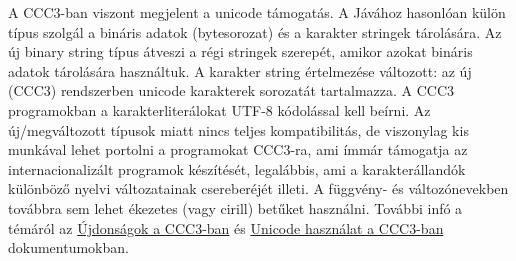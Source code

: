 A CCC3-ban viszont megjelent a unicode támogatás.
A Jávához hasonlóan külön típus szolgál a bináris
adatok (bytesorozat) és a karakter stringek tárolására.
Az új binary string típus átveszi a régi stringek szerepét,
amikor azokat bináris adatok tárolására használtuk.
A karakter string értelmezése változott: 
az új (CCC3) rendszerben unicode karakterek sorozatát tartalmazza.
A CCC3 programokban a karakterliterálokat UTF-8 kódolással kell beírni.
Az új/megváltozott típusok miatt nincs teljes kompatibilitás,
de viszonylag kis munkával lehet portolni a programokat CCC3-ra, 
ami ímmár támogatja az internacionalizált programok készítését,
legalábbis, ami a karakterállandók különböző nyelvi változatainak 
csereberéjét illeti. 
A függvény- és változónevekben továbbra sem lehet ékezetes 
(vagy cirill) betűket használni.
További infó a témáról az
\href{ccc3_ujdonsagok.html}{Újdonságok a CCC3-ban} és
\href{ccc3_unicode_hasznalat.html}{Unicode használat a CCC3-ban}
dokumentumokban.




